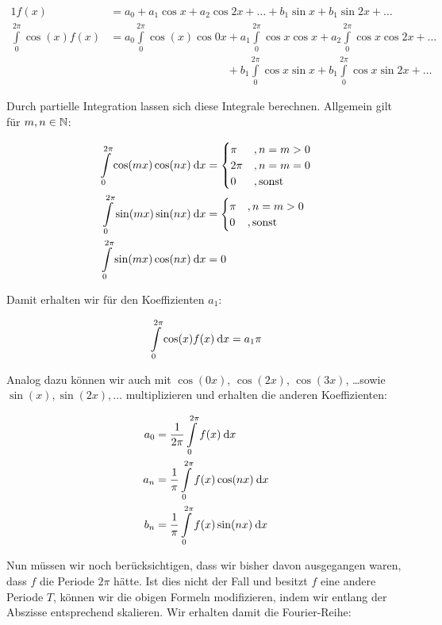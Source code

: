 \begin{alignat*}{1}
    f(x)                              &= a_0 + a_1 \cos x + a_2 \cos 2x + \dots + b_1 \sin x + b_1 \sin 2x + \dots \\
    \int\limits_0^{2\pi} \cos(x) f(x) &= a_0 \int\limits_0^{2\pi} \cos(x) \cos 0x           + a_1 \int\limits_0^{2\pi} \cos x \cos x + a_2 \int\limits_0^{2\pi} \cos x \cos 2x + \dots \\
                                      &\phantom{{}= a_0 \int\limits_0^{2\pi} \cos(x) \cos 0x} + b_1 \int\limits_0^{2\pi} \cos x \sin x + b_1 \int\limits_0^{2\pi} \cos x \sin 2x + \dots
\end{alignat*}

Durch partielle Integration lassen sich diese Integrale berechnen. Allgemein gilt für $m,n\in\mathbb{N}$:

\begin{alignat*}{1}
    \int\limits_0^{2\pi} \cos(mx) \cos(nx) \:\mathrm{d}{x} &= \begin{cases} \pi & , n = m > 0 \\ 2 \pi &, n = m = 0 \\ 0 &, \text{sonst} \end{cases} \\
    \int\limits_0^{2\pi} \sin(mx) \sin(nx) \:\mathrm{d}{x} &= \begin{cases} \pi & , n = m > 0 \\ 0 &, \text{sonst} \end{cases} \\
    \int\limits_0^{2\pi} \sin(mx) \cos(nx) \:\mathrm{d}{x} &= 0
\end{alignat*}

Damit erhalten wir für den Koeffizienten $a_1$:

$$
    \int\limits_0^{2\pi} \cos(x) f(x) \:\mathrm{d}{x} = a_1 \pi
$$

Analog dazu können wir auch mit $\cos(0x)$, $\cos(2x)$, $\cos(3x)$, \dots sowie $\sin(x), \sin(2x), \dots$ multiplizieren und erhalten die anderen Koeffizienten:

\begin{alignat*}{1}
    a_0 &= \frac{1}{2\pi} \int\limits_0^{2\pi} f(x) \:\mathrm{d}{x} \\
    a_n &= \frac{1}{\pi} \int\limits_0^{2\pi} f(x) \cos(nx) \:\mathrm{d}{x} \\
    b_n &= \frac{1}{\pi} \int\limits_0^{2\pi} f(x) \sin(nx) \:\mathrm{d}{x}
\end{alignat*}

Nun müssen wir noch berücksichtigen, dass wir bisher davon ausgegangen waren, dass $f$ die Periode $2\pi$ hätte. Ist dies nicht der Fall und besitzt $f$ eine andere Periode $T$, können wir die obigen Formeln modifizieren, indem wir entlang der Abszisse entsprechend skalieren. Wir erhalten damit die Fourier-Reihe:


